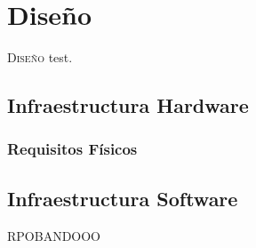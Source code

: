 \chapter{Diseño}
\label{chap:diseño}

\lettrine{D}{iseño} test.

\section{Infraestructura Hardware}
\label{sec:design_infra_hardware}

\subsection{Requisitos Físicos}


\section{Infraestructura Software}
\label{sec:design_infra_software}

RPOBANDOOO